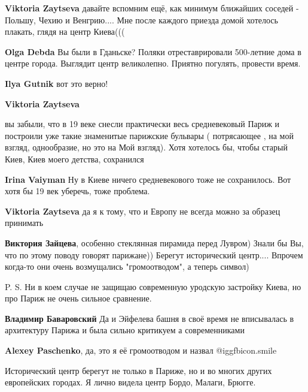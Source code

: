 \begin{itemize}
\begin{itemize} %
\textbf{Viktoria Zaytseva} давайте вспомним ещё, как минимум ближайших соседей - Польшу, Чехию и Венгрию.... Мне после каждого приезда домой хотелось плакать, глядя на центр Киева(((

\begin{itemize} %
\textbf{Olga Debda} Вы были в Гданьске? Поляки отреставрировали 500-летние дома в центре города. Выглядит центр великолепно. Приятно погулять, провести время.

\textbf{Ilya Gutnik} вот это верно!
\end{itemize} %

\textbf{Viktoria Zaytseva} 

вы забыли, что в 19 веке снесли практически весь средневековый Париж и
построили уже такие знаменитые парижские бульвары ( потрясающее , на мой
взгляд, однообразие, но это на Мой взгляд). Хотя хотелось бы, чтобы старый
Киев, Киев моего детства, сохранился

\begin{itemize} %
\textbf{Irina Vaiyman} Ну в Киеве ничего средневекового тоже не сохранилось. Вот хотя бы 19 век уберечь, тоже проблема.

\textbf{Viktoria Zaytseva} да я к тому, что и Европу не всегда можно за образец принимать
\end{itemize} %

\textbf{Виктория Зайцева}, особенно стеклянная пирамида перед Лувром) Знали бы Вы, что по этому поводу говорят парижане)) Берегут исторический центр.... Впрочем когда-то они очень возмущались "громоотводом", а теперь символ)

P. S. Ни в коем случае не защищаю современную уродскую застройку Киева, но про
Париж не очень сильное сравнение.

\begin{itemize} %
\textbf{Владимир Баваровский} Да и Эйфелева башня в своё время не вписывалась в архитектуру Парижа и была сильно критикуем а современниками

\textbf{Alexey Paschenko}, да, это я её громоотводом и назвал @igg{fbicon.smile} 
\end{itemize} %


Исторический центр берегут не только в Париже, но и во многих других
европейских городах. Я лично видела центр Бордо, Малаги, Брюгге.


\end{itemize}
\end{itemize}
